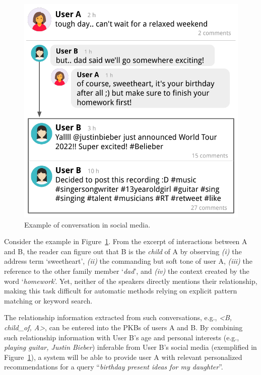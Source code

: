 \begin{figure}[t!]
\centering
\begin{adjustbox}{width=0.46\textwidth}
\includegraphics{imgs/conversation_example}
\end{adjustbox}
\caption{Example of 
conversation in social media.}
\label{example_conv}
\end{figure}

Consider the example in Figure~\ref{example_conv}.
From the excerpt of interactions between A and B, the reader can figure out that B is the \textit{child} of A by observing \textit{(i)} the address term `sweetheart', \textit{(ii)} the commanding but soft tone of user A, \textit{(iii)} the reference to the other family member `\textit{dad}', and \textit{(iv)} the context created by the word `\textit{homework}'. Yet, neither of the speakers directly mentions their relationship, making this task difficult for automatic methods 
relying on explicit pattern matching or keyword search.

The relationship information extracted from such conversations, e.g., \textit{<B, child\_of, A>}, can be entered into the PKBs of users A and B. By combining such relationship information with User B's age and personal interests (e.g., \emph{playing guitar, Justin Bieber}) inferable from User B's social media (exemplified in Figure~\ref{example_conv}), 
a system will be able to provide
user A with relevant personalized recommendations for a query ``\textit{birthday present ideas for my daughter}''. 

